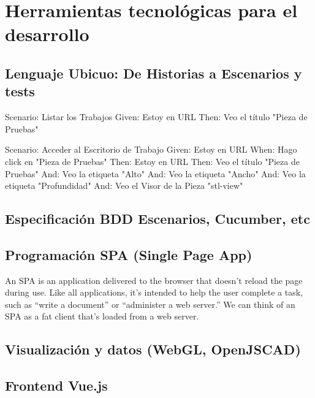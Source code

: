 \section{Herramientas tecnológicas para el desarrollo}

\subsection{Lenguaje Ubicuo: De Historias a Escenarios y tests}

Scenario: Listar los Trabajos\vskip0mm
  Given: Estoy en URL\vskip0mm
  Then: Veo el título "Pieza de Pruebas"\vskip10mm
 
Scenario: Acceder al Escritorio de Trabajo\vskip0mm
  Given: Estoy en URL\vskip0mm
  When: Hago click en "Pieza de Pruebas"\vskip0mm
  Then: Estoy en URL\vskip0mm
  Then: Veo el título "Pieza de Pruebas"\vskip0mm
  And: Veo la etiqueta "Alto"\vskip0mm
  And: Veo la etiqueta "Ancho"\vskip0mm
  And: Veo la etiqueta "Profundidad"\vskip0mm
  And: Veo el Visor de la Pieza "stl-view"
  
\subsection{Especificación BDD Escenarios, Cucumber, etc}

\subsection{Programación SPA (Single Page App)}

\begin{displayquote}
An SPA is an application delivered to the browser that doesn’t reload the page during use. Like all applications, it’s intended to help the user complete a task, such as “write a document” or “administer a web server.” We can think of an SPA as a fat client that’s loaded from a web server. \cite{Mikowski2015}
\end{displayquote}



\subsection{Visualización y datos (WebGL, OpenJSCAD)}

\subsection{Frontend Vue.js}

